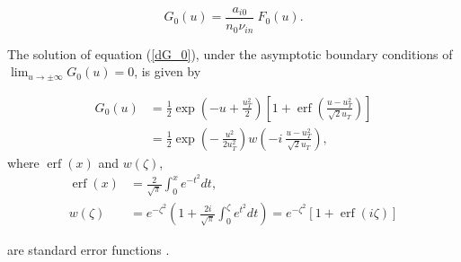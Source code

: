 \documentclass[draft]{agujournal2019}
\begin{document}
{\begin{linenomath*}
\begin{equation}
G_{0}(u)=\frac{a_{i0}}{n_{0}\nu_{in}}\ F_{0}(u). 
\label{G_0}
\end{equation}
\end{linenomath*}
The solution of equation (\ref{dG_0}), under the asymptotic boundary
conditions of $\lim_{u\rightarrow\pm\infty}G_{0}(u)=0$, is given by
\begin{linenomath*}
\begin{align}
G_{0}(u)  &  =\frac{1}{2}\exp\left(  -u+\frac{u_{T}^{2}}{2}\right)  \left[
1+\operatorname{erf}\left(  \frac{u-u_{T}^{2}}{\sqrt{2}u_{T}}\right)  \right]
\nonumber\\
&  =\frac{1}{2}\exp\left(  -\ \frac{u^{2}}{2u_{T}^{2}}\right)  w\left(
-i\ \frac{u-u_{T}^{2}}{\sqrt{2}u_{T}}\right)  , \label{G_0_via_erf}%
\end{align}
where $\operatorname{erf}(x)$ and $w(\zeta)$,
\begin{align}
\operatorname{erf}(x)  &  =\frac{2}{\sqrt{\pi}}\int_{0}^{x}e^{-t^{2}%
}dt,\nonumber\\
w(\zeta)  &  =e^{-\zeta^{2}}\left(  1+\frac{2i}{\sqrt{\pi}}\int_{0}^{\zeta
}e^{t^{2}}dt\right)  =e^{-\zeta^{2}}\left[  1+\operatorname{erf}%
(i\zeta)\right]  
\label{erf(x)}
\end{align}
\end{linenomath*}
are standard error functions \cite{Abramowitz:Handbook88}.

}
\end{document}
